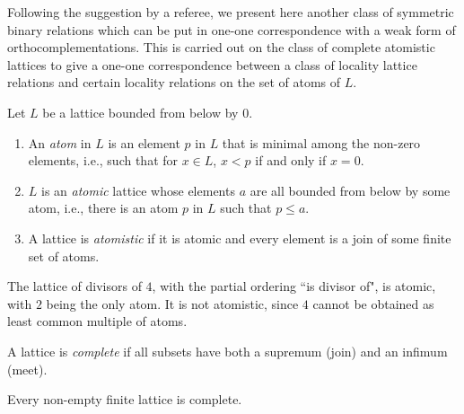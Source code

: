 \documentclass[10pt,a4paper]{amsart}
\numberwithin{equation}{section}
\begin{document}
Following the suggestion by a referee, we present here another class of symmetric binary relations which can be put in one-one correspondence with a weak form of orthocomplementations. This is carried out on the class of complete atomistic lattices to give a one-one correspondence between a class of locality lattice relations and certain locality relations on the set of atoms of $L$.
\begin{Definition}Let $L$ be a lattice bounded from below by $0$.
	\begin{enumerate}\itemsep=0pt
		\item An {\it atom} in $L$ is an element $p$ in $L$ that is minimal among the non-zero elements, i.e., such that for $x\in L$, $x< p$ if and only if $x=0$.
		\item $L$ is an {\it atomic} lattice whose elements $a$ are all bounded from below by some atom, i.e., there is an atom $p$ in $L$ such that $p\leq a$.
		\item
		A lattice is {\it atomistic} if it is atomic and every element is a join of some finite set of atoms.
	\end{enumerate}
\end{Definition}
\begin{Example}
	The lattice of divisors of $4$, with the partial ordering ``is divisor of", is atomic, with $2$ being the only atom. It is not atomistic, since $4$ cannot be obtained as least common multiple of atoms.
\end{Example}
\begin{Definition} A lattice is {\it complete} if all subsets have both a supremum (join) and an infimum (meet).
\end{Definition}\begin{Example} Every non-empty finite lattice is complete.
\end{Example}
\end{document}
